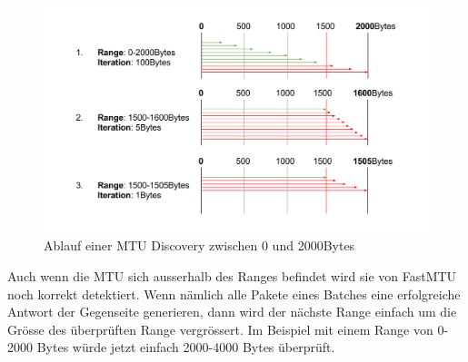 \begin{figure}[H]
    \begin{center}
        \includegraphics[clip,width=\textwidth]{mainpart/implementation/img/FastMTUAlgorithm}
    \end{center}
    \caption{Ablauf einer MTU Discovery zwischen 0 und 2000Bytes}
\end{figure}

Auch wenn die \acs{MTU} sich ausserhalb des Ranges befindet wird sie von FastMTU noch korrekt detektiert. Wenn nämlich alle Pakete eines Batches eine erfolgreiche Antwort der Gegenseite generieren, dann wird der nächste Range einfach um die Grösse des überprüften Range vergrössert. Im Beispiel mit einem Range von 0-2000 Bytes würde jetzt einfach 2000-4000 Bytes überprüft.